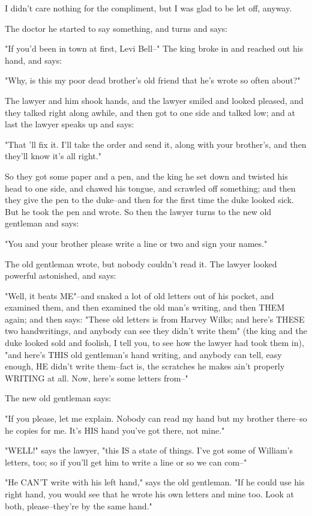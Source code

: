 I didn't care nothing for the compliment, but I was glad to be let off,
anyway.

The doctor he started to say something, and turns and says:

"If you'd been in town at first, Levi Bell--" The king broke in and
reached out his hand, and says:

"Why, is this my poor dead brother's old friend that he's wrote so often
about?"

The lawyer and him shook hands, and the lawyer smiled and looked pleased,
and they talked right along awhile, and then got to one side and talked
low; and at last the lawyer speaks up and says:

"That 'll fix it.  I'll take the order and send it, along with your
brother's, and then they'll know it's all right."

So they got some paper and a pen, and the king he set down and twisted
his head to one side, and chawed his tongue, and scrawled off something;
and then they give the pen to the duke--and then for the first time the
duke looked sick.  But he took the pen and wrote.  So then the lawyer
turns to the new old gentleman and says:

"You and your brother please write a line or two and sign your names."

The old gentleman wrote, but nobody couldn't read it.  The lawyer looked
powerful astonished, and says:

"Well, it beats ME"--and snaked a lot of old letters out of his pocket,
and examined them, and then examined the old man's writing, and then THEM
again; and then says:  "These old letters is from Harvey Wilks; and
here's THESE two handwritings, and anybody can see they didn't write
them" (the king and the duke looked sold and foolish, I tell you, to see
how the lawyer had took them in), "and here's THIS old gentleman's hand
writing, and anybody can tell, easy enough, HE didn't write them--fact
is, the scratches he makes ain't properly WRITING at all.  Now, here's
some letters from--"

The new old gentleman says:

"If you please, let me explain.  Nobody can read my hand but my brother
there--so he copies for me.  It's HIS hand you've got there, not mine."

"WELL!" says the lawyer, "this IS a state of things.  I've got some of
William's letters, too; so if you'll get him to write a line or so we can
com--"

"He CAN'T write with his left hand," says the old gentleman.  "If he
could use his right hand, you would see that he wrote his own letters and
mine too.  Look at both, please--they're by the same hand."

